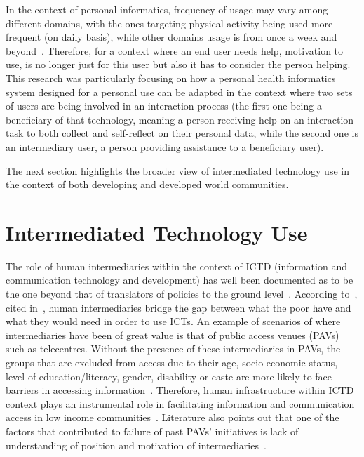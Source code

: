 In the context of personal informatics, frequency of usage may vary among different domains, with the ones targeting physical activity being used more frequent (on daily basis), while other domains usage is from once a week and beyond~\citep{epstein2015lived}. Therefore, for a context where an end user needs help, motivation to use, is no longer just for this user but also it has to consider the person helping. This research was particularly focusing on how a personal health informatics system  designed for a personal use can be adapted in the context where two sets of users are being involved in an interaction process (the first one being a beneficiary of that technology, meaning a person receiving help on an interaction task to both collect and self-reflect on their personal data, while the second one is an intermediary user, a person providing assistance to a beneficiary user). 

The next section highlights the broader view of intermediated technology use in the context of both developing and developed world communities.  

\section{Intermediated Technology Use}
The role of human intermediaries within the context of ICTD (information and communication technology and development) has well been documented as to be the one beyond that of translators of policies to the ground level~\citep{bailur2010liminal}. According to~\cite{heeks1999tyranny}, cited in~\cite{bailur2012complex}, human intermediaries bridge the gap between what the poor have and what they would need in order to use ICTs. An example of  scenarios of where intermediaries have been of great value is that of public access venues (PAVs) such as telecentres. Without the presence of these intermediaries in PAVs, the groups that are excluded from access due to their age, socio-economic status, level of education/literacy, gender, disability or caste are more likely to face barriers in accessing information~\citep{ramirez2013infomediaries}. Therefore, human infrastructure within ICTD context plays an instrumental role in facilitating information and communication access in low income communities~\citep{sambasivan2010human}.
Literature also points out that one of the factors that contributed to failure of past PAVs' initiatives is lack of understanding of position and motivation of intermediaries~\citep{bailur2010liminal}.
 
